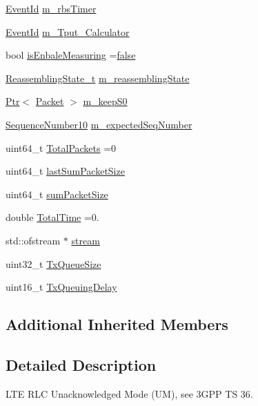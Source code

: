 \begin{DoxyCompactItemize}
\item 
\hyperlink{classns3_1_1EventId}{Event\+Id} \hyperlink{classns3_1_1LteRlcUm_a8196c33f6c1c18fe6dae6be6639f8c06}{m\+\_\+rbs\+Timer}
\item 
\hyperlink{classns3_1_1EventId}{Event\+Id} \hyperlink{classns3_1_1LteRlcUm_af24ae932eded5469f4ad2185b656bee1}{m\+\_\+\+Tput\+\_\+\+Calculator}
\item 
bool \hyperlink{classns3_1_1LteRlcUm_a33e4345196c0c97f6b1954e108ccbb45}{is\+Enbale\+Measuring} =\hyperlink{lte__cqi__generation_8m_ab1bef239d413c4da139c4bac92cd657a}{false}
\item 
\hyperlink{classns3_1_1LteRlcUm_ae16a0c69b1e6723a7e1f633b53768cd6}{Reassembling\+State\+\_\+t} \hyperlink{classns3_1_1LteRlcUm_a633557b2a49dd50bec8c59ce8dacad71}{m\+\_\+reassembling\+State}
\item 
\hyperlink{classns3_1_1Ptr}{Ptr}$<$ \hyperlink{classns3_1_1Packet}{Packet} $>$ \hyperlink{classns3_1_1LteRlcUm_a094b0b91046a4d9853cba45bcf64eaec}{m\+\_\+keep\+S0}
\item 
\hyperlink{classns3_1_1SequenceNumber10}{Sequence\+Number10} \hyperlink{classns3_1_1LteRlcUm_a55c7d22f64cc0dcebab7caf96dbac1e3}{m\+\_\+expected\+Seq\+Number}
\item 
uint64\+\_\+t \hyperlink{classns3_1_1LteRlcUm_aa73359807fbf8026a89c765b619e0e30}{Total\+Packets} =0
\item 
uint64\+\_\+t \hyperlink{classns3_1_1LteRlcUm_a015feff20aa27cbdb84c18fbdb482027}{last\+Sum\+Packet\+Size}
\item 
uint64\+\_\+t \hyperlink{classns3_1_1LteRlcUm_aa873d03add0bb0b7d5a9ac3224685fd2}{sum\+Packet\+Size}
\item 
double \hyperlink{classns3_1_1LteRlcUm_a94d9298d5b49e9f301caacf6c849eacc}{Total\+Time} =0.
\item 
std\+::ofstream $\ast$ \hyperlink{classns3_1_1LteRlcUm_a8509783beb5d5625757bdf93549079f6}{stream}
\item 
uint32\+\_\+t \hyperlink{classns3_1_1LteRlcUm_a14a499b2042957fefdeb2ed75a090c5c}{Tx\+Queue\+Size}
\item 
uint16\+\_\+t \hyperlink{classns3_1_1LteRlcUm_aeeec4694ffd96880f4a05c5e200c97b4}{Tx\+Queuing\+Delay}
\end{DoxyCompactItemize}
\subsection*{Additional Inherited Members}


\subsection{Detailed Description}
L\+TE R\+LC Unacknowledged Mode (UM), see 3\+G\+PP TS 36. 

